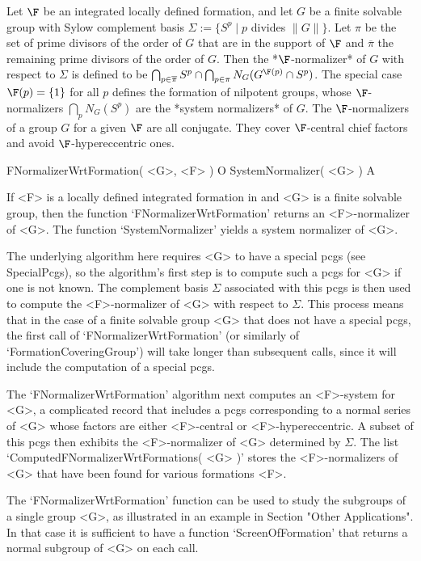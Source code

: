 


Let $\F$ be an integrated locally defined formation, and let $G$ be 
a finite solvable group with Sylow complement basis $\Sigma := 
\{ S^p \mid p$ divides  $ \|G\| \}$.  Let $\pi$ be the set of prime
divisors of the order of $G$ that are in the support of $\F$ and 
$\overline{\pi}$ the remaining prime divisors of the order  of $G$. 
Then the *$\F$-normalizer* of $G$ with respect to $\Sigma$ is defined 
to be  
$\bigcap_{p \in \overline{\pi}} S^p \cap 
 \bigcap_{p \in \pi} N_G( G^{\F(p)} \cap S^p )$. 
The special case $\F(p) = \{ 1 \}$ for all $p$ defines the formation 
of nilpotent groups, whose $\F$-normalizers $ \bigcap_{p} N_G( S^p )$ 
are the *system normalizers* of $G$. The $\F$-normalizers of a group 
$G$ for a given $\F$ are all conjugate. They cover $\F$-central chief 
factors and avoid $\F$-hypereccentric ones.

\> FNormalizerWrtFormation( <G>, <F> ) O
\> SystemNormalizer( <G> ) A

If <F> is a locally defined integrated formation in {\GAP} and 
<G> is a finite solvable group, then the function `FNormalizerWrtFormation'
returns an <F>-normalizer of <G>. The function `SystemNormalizer' yields a 
system normalizer of <G>.

The underlying algorithm here requires <G> to have a special pcgs (see SpecialPcgs), so the algorithm's first step is
 to compute such a pcgs for <G> if one is not known. The complement basis
$\Sigma$ associated with this pcgs is then used to compute the
<F>-normalizer of <G> with respect to $\Sigma$. This process means that 
in the case of a finite solvable group <G> that does not have a special pcgs, 
the first call of `FNormalizerWrtFormation' (or similarly of `FormationCoveringGroup') 
will  take longer than subsequent calls, since it will include the
computation  of a special pcgs.

The `FNormalizerWrtFormation' algorithm next computes an <F>-system for <G>, a
complicated record that includes a pcgs corresponding to a normal series 
of <G> whose factors are either <F>-central or <F>-hypereccentric. A subset 
of this pcgs then exhibits the <F>-normalizer of <G> determined by
$\Sigma$. The list `ComputedFNormalizerWrtFormations( <G> )' stores the <F>-normalizers
of <G> that have been found for various formations <F>.  

The `FNormalizerWrtFormation' function can be used to study the subgroups of a 
single group <G>, as illustrated in an example in Section "Other Applications". In that case it is sufficient to have a function
`ScreenOfFormation' that  returns a normal subgroup of <G> on each call.


